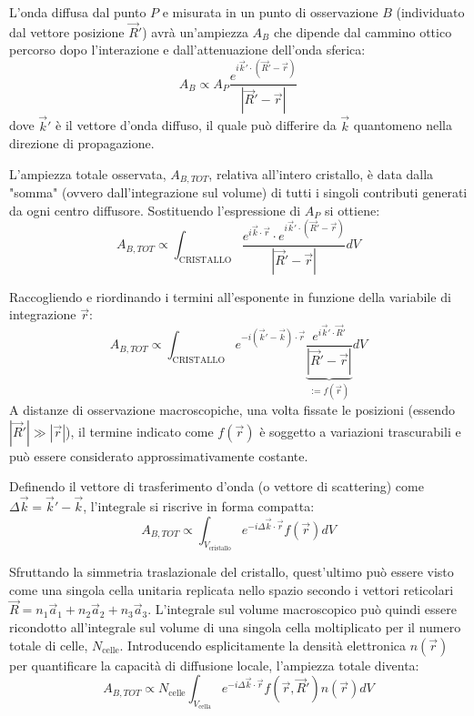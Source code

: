 L'onda diffusa dal punto \( P \) e misurata in un punto di osservazione \( B \) (individuato dal vettore posizione \( \vec{R}' \)) avrà un'ampiezza \( A_B \) che dipende dal cammino ottico percorso dopo l'interazione e dall'attenuazione dell'onda sferica:
\begin{equation}
    A_B \propto A_P \frac{e^{i \vec{k}' \cdot (\vec{R}' - \vec{r})}}{|\vec{R}' - \vec{r}|}
\end{equation}
dove \( \vec{k}' \) è il vettore d'onda diffuso, il quale può differire da \( \vec{k} \) quantomeno nella direzione di propagazione.

L'ampiezza totale osservata, \( A_{B,TOT} \), relativa all'intero cristallo, è data dalla "somma" (ovvero dall'integrazione sul volume) di tutti i singoli contributi generati da ogni centro diffusore. Sostituendo l'espressione di \( A_P \) si ottiene:
\begin{equation}
    A_{B,TOT} \propto \int_{\text{CRISTALLO}} \frac{e^{i \vec{k} \cdot \vec{r}} \cdot e^{i \vec{k}' \cdot (\vec{R}' - \vec{r})}}{|\vec{R}' - \vec{r}|} dV
\end{equation}

Raccogliendo e riordinando i termini all'esponente in funzione della variabile di integrazione \( \vec{r} \):
\begin{equation}
    A_{B,TOT} \propto \int_{\text{CRISTALLO}} e^{-i (\vec{k}' - \vec{k}) \cdot \vec{r}} \underbrace{\frac{e^{i \vec{k}' \cdot \vec{R}'}}{|\vec{R}' - \vec{r}|}}_{:= f(\vec{r})} dV
\end{equation}
A distanze di osservazione macroscopiche, una volta fissate le posizioni (essendo \( |\vec{R}'| \gg |\vec{r}| \)), il termine indicato come \( f(\vec{r}) \) è soggetto a variazioni trascurabili e può essere considerato approssimativamente costante.

Definendo il vettore di trasferimento d'onda (o vettore di scattering) come \( \Delta\vec{k} = \vec{k}' - \vec{k} \), l'integrale si riscrive in forma compatta:
\begin{equation}
    A_{B,TOT} \propto \int_{V_{\text{cristallo}}} e^{-i \Delta\vec{k} \cdot \vec{r}} f(\vec{r}) dV
\end{equation}

Sfruttando la simmetria traslazionale del cristallo, quest'ultimo può essere visto come una singola cella unitaria replicata nello spazio secondo i vettori reticolari \( \vec{R} = n_1\vec{a}_1 + n_2\vec{a}_2 + n_3\vec{a}_3 \). L'integrale sul volume macroscopico può quindi essere ricondotto all'integrale sul volume di una singola cella moltiplicato per il numero totale di celle, \( N_{\text{celle}} \). 
Introducendo esplicitamente la densità elettronica \( n(\vec{r}) \) per quantificare la capacità di diffusione locale, l'ampiezza totale diventa:
\begin{equation}
    A_{B,TOT} \propto N_{\text{celle}} \int_{V_{\text{cella}}} e^{-i \Delta\vec{k} \cdot \vec{r}} f(\vec{r}, \vec{R}') n(\vec{r}) dV
\end{equation}

